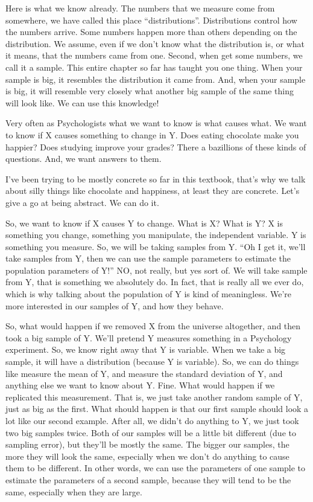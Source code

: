 \documentclass[]{book}
\begin{document}
Here is what we know already. The numbers that we measure come from somewhere, we have called this place ``distributions''. Distributions control how the numbers arrive. Some numbers happen more than others depending on the distribution. We assume, even if we don't know what the distribution is, or what it means, that the numbers came from one. Second, when get some numbers, we call it a sample. This entire chapter so far has taught you one thing. When your sample is big, it resembles the distribution it came from. And, when your sample is big, it will resemble very closely what another big sample of the same thing will look like. We can use this knowledge!

Very often as Psychologists what we want to know is what causes what. We want to know if X causes something to change in Y. Does eating chocolate make you happier? Does studying improve your grades? There a bazillions of these kinds of questions. And, we want answers to them.

I've been trying to be mostly concrete so far in this textbook, that's why we talk about silly things like chocolate and happiness, at least they are concrete. Let's give a go at being abstract. We can do it.

So, we want to know if X causes Y to change. What is X? What is Y? X is something you change, something you manipulate, the independent variable. Y is something you measure. So, we will be taking samples from Y. ``Oh I get it, we'll take samples from Y, then we can use the sample parameters to estimate the population parameters of Y!'' NO, not really, but yes sort of. We will take sample from Y, that is something we absolutely do. In fact, that is really all we ever do, which is why talking about the population of Y is kind of meaningless. We're more interested in our samples of Y, and how they behave.

So, what would happen if we removed X from the universe altogether, and then took a big sample of Y. We'll pretend Y measures something in a Psychology experiment. So, we know right away that Y is variable. When we take a big sample, it will have a distribution (because Y is variable). So, we can do things like measure the mean of Y, and measure the standard deviation of Y, and anything else we want to know about Y. Fine. What would happen if we replicated this measurement. That is, we just take another random sample of Y, just as big as the first. What should happen is that our first sample should look a lot like our second example. After all, we didn't do anything to Y, we just took two big samples twice. Both of our samples will be a little bit different (due to sampling error), but they'll be mostly the same. The bigger our samples, the more they will look the same, especially when we don't do anything to cause them to be different. In other words, we can use the parameters of one sample to estimate the parameters of a second sample, because they will tend to be the same, especially when they are large.
\end{document}
